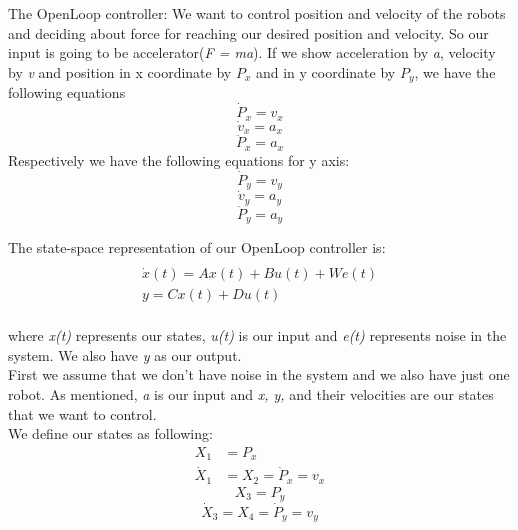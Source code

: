 \documentclass[10pt,letterpaper]{article}
\begin{document}
The OpenLoop controller: We want to control position and velocity of the robots and deciding about force for reaching our desired position and velocity. So our input is going to be accelerator(\emph{F = ma}). If we show acceleration by \emph{a}, velocity by \emph{v} and position in x coordinate by \emph{$P_x$} and in y coordinate by \emph{$P_y$}, we have the following equations
\begin{equation}
\dot{P}_x = v_x
\end{equation}
\begin{equation}
\dot{v}_x = a_x
\end{equation}
\begin{equation}
\ddot{P}_x= a_x
\end{equation}
Respectively we have the following equations for y axis:
\begin{equation}
\dot{P}_y= v_y
\end{equation}
\begin{equation}
\dot{v}_y = a_y
\end{equation}
\begin{equation}
\ddot{P}_y= a_y
\end{equation}


The state-space representation of our OpenLoop controller is: 
\begin{multline}
\\
\dot{x}(t)  =  A x(t) + B u(t) + We(t)\\
y = C x(t) + D u(t)\\
\end{multline}

where \emph{x(t)} represents our states, \emph{u(t)} is our input and \emph{e(t)} represents noise in the system. We also have \emph{y} as our output.\\
First we assume that we don't have noise in the system and we also have just one robot. As mentioned, \emph{a} is our input and \emph{x, y,} and their velocities are our states that we want to control.\\
We define our states as following:
\begin{align}
X_1 &= P_x \\
\dot{X}_1 &= X_2 = \dot{P}_x = v_x
\end{align}
\begin{equation}
X_3 = P_y 
\end{equation}
\begin{equation}
\dot{X}_3 = X_4 = \dot{P}_y = v_y 
\end{equation}
\end{document}
